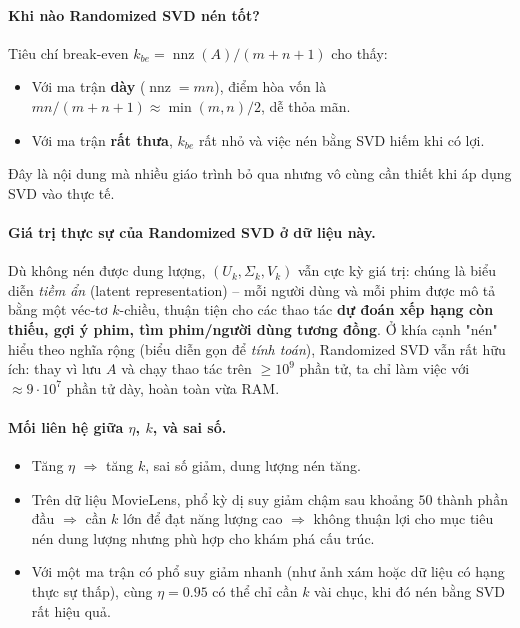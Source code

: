 \paragraph{Khi nào Randomized SVD nén tốt?}
Tiêu chí break-even $k_{be} = \operatorname{nnz}(A)/(m+n+1)$ cho thấy:
\begin{itemize}
    \item Với ma trận \textbf{dày} ($\operatorname{nnz} = mn$), điểm hòa vốn
    là $mn/(m+n+1) \approx \min(m,n)/2$, dễ thỏa mãn.
    \item Với ma trận \textbf{rất thưa}, $k_{be}$ rất nhỏ và việc nén bằng SVD
    hiếm khi có lợi.
\end{itemize}
Đây là nội dung mà nhiều giáo trình bỏ qua nhưng vô cùng cần thiết khi áp dụng
SVD vào thực tế.

\paragraph{Giá trị thực sự của Randomized SVD ở dữ liệu này.}
Dù không nén được dung lượng, $(U_k, \Sigma_k, V_k)$ vẫn cực kỳ giá trị: chúng
là biểu diễn \emph{tiềm ẩn} (latent representation) -- mỗi người dùng và mỗi
phim được mô tả bằng một véc-tơ $k$-chiều, thuận tiện cho các thao tác
\textbf{dự đoán xếp hạng còn thiếu, gợi ý phim, tìm phim/người dùng tương đồng}.
Ở khía cạnh "nén" hiểu theo nghĩa rộng (biểu diễn gọn để \emph{tính toán}),
Randomized SVD vẫn rất hữu ích: thay vì lưu $A$ và chạy thao tác trên $\ge 10^9$
phần tử, ta chỉ làm việc với $\approx 9\cdot 10^7$ phần tử dày, hoàn toàn vừa RAM.

\paragraph{Mối liên hệ giữa $\eta$, $k$, và sai số.}
\begin{itemize}
    \item Tăng $\eta$ $\Rightarrow$ tăng $k$, sai số giảm, dung lượng nén tăng.
    \item Trên dữ liệu MovieLens, phổ kỳ dị suy giảm chậm sau khoảng $50$ thành
    phần đầu $\Rightarrow$ cần $k$ lớn để đạt năng lượng cao $\Rightarrow$
    không thuận lợi cho mục tiêu nén dung lượng nhưng phù hợp cho khám phá cấu
    trúc.
    \item Với một ma trận có phổ suy giảm nhanh (như ảnh xám hoặc dữ liệu có
    hạng thực sự thấp), cùng $\eta=0.95$ có thể chỉ cần $k$ vài chục, khi đó
    nén bằng SVD rất hiệu quả.
\end{itemize}

